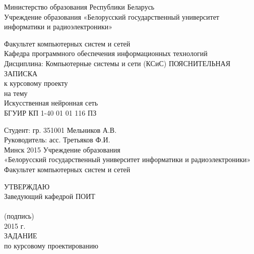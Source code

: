 \documentclass[14pt,a4paper]{extreport}
\title{}
\author{}
\begin{document}
	\center
	Министерство образования Республики Беларусь\\
	Учреждение образования «Белорусский государственный университет информатики и радиоэлектроники»
	\vspace*{2cm}
	\endcenter
	\raggedright
	Факультет компьютерных систем и сетей\\
	\medskip
	Кафедра программного обеспечения информационных технологий\\
	\medskip
	Дисциплина:  Компьютерные системы и сети (КСиС)
	\vspace*{2cm}
	\center
	ПОЯСНИТЕЛЬНАЯ ЗАПИСКА\\
	к курсовому проекту\\
	на тему\\
	\medskip
	Искусственная нейронная сеть\\
	\medskip
	БГУИР КП  1-40 01 01 116 ПЗ
	\vspace*{4cm}
	\endcenter
	\raggedright
	\hspace*{7.94cm} Студент: гр. 351001 Мельников А.В.\\
	\bigskip
	\hspace*{7.94cm}Руководитель: асс. Третьяков Ф.И.\\
	\center
	\vspace*{6cm}
	Минск 2015
	\pagestyle{empty}
	\newpage
	\center
	Учреждение образования\\
	\medskip
	«Белорусский государственный университет информатики и радиоэлектроники»\\
	\medskip
	Факультет компьютерных систем и сетей\\
	\medskip
	\endcenter
	\raggedright
	\hspace*{9.53cm}УТВЕРЖДАЮ\\
	\hspace*{9.53cm}Заведующий кафедрой ПОИТ\\
	\hspace*{9.53cm}\underline{\hspace{6cm}} \\
	\hspace*{11cm}\small (подпись) \normalsize\\
	\hspace*{9.53cm}\underline{\hspace{5cm}}2015 г.\\
	\medskip
	\center
	ЗАДАНИЕ\\
	по курсовому проектированию\\
	\medskip
\end{document}
